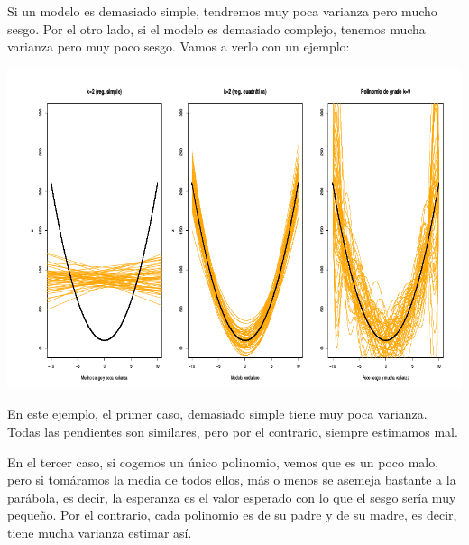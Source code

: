 \begin{example}

Si un modelo es demasiado simple, tendremos muy poca varianza pero mucho sesgo. Por el otro lado, si el modelo es demasiado complejo, tenemos mucha varianza pero muy poco sesgo. Vamos a verlo con un ejemplo:

\begin{center}
\includegraphics[scale=0.45]{img/ModeloSimpleVsModeloComplejo.png}
\end{center}

En este ejemplo, el primer caso, demasiado simple tiene muy poca varianza. Todas las pendientes son similares, pero por el contrario, siempre estimamos mal.

En el tercer caso, si cogemos un único polinomio, vemos que es un poco malo, pero si tomáramos la media de todos ellos, más o menos se asemeja bastante a la parábola, es decir, la esperanza es el valor esperado con lo que el sesgo sería muy pequeño. Por el contrario, cada polinomio es de su padre y de su madre, es decir, tiene mucha varianza estimar así.
\end{example}

